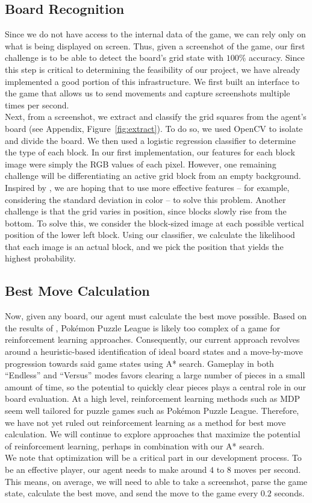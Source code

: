 \documentclass[10pt, final]{article}
\newcommand{\br}[1][.75]{\ \\[#1\baselineskip]}
\begin{document}
\subsection{Board Recognition}
Since we do not have access to the internal data of the game, we can rely only on what is being displayed on screen. Thus, given a screenshot of the game, our first challenge is to be able to detect the board's grid state with $100\%$ accuracy. Since this step is critical to determining the feasibility of our project, we have already implemented a good portion of this infrastructure. We first built an interface to the game that allows us to send movements and capture screenshots multiple times per second.\br
Next, from a screenshot, we extract and classify the grid squares from the agent's board (see Appendix, Figure~\ref{fig:extract}). To do so, we used OpenCV to isolate and divide the board. We then used a logistic regression classifier to determine the type of each block. In our first implementation, our features for each block image were simply the RGB values of each pixel. However, one remaining challenge will be differentiating an active grid block from an empty background. Inspired by \cite{1}, we are hoping that to use more effective features -- for example, considering the standard deviation in color -- to solve this problem. Another challenge is that the grid varies in position, since blocks slowly rise from the bottom. To solve this, we consider the block-sized image at each possible vertical position of the lower left block. Using our classifier, we calculate the likelihood that each image is an actual block, and we pick the position that yields the highest probability.

\subsection{Best Move Calculation}
Now, given any board, our agent must calculate the best move possible. Based on the results of \cite{2}, Pok\'{e}mon Puzzle League is likely too complex of a game for reinforcement learning approaches. Consequently, our current approach revolves around a heuristic-based identification of ideal board states and a move-by-move progression towards said game states using A* search. Gameplay in both ``Endless'' and ``Versus'' modes favors clearing a large number of pieces in a small amount of time, so the potential to quickly clear pieces plays a central role in our board evaluation. At a high level, reinforcement learning methods such as MDP seem well tailored for puzzle games such as Pok\'{e}mon Puzzle League. Therefore, we have not yet ruled out reinforcement learning as a method for best move calculation. We will continue to explore approaches that maximize the potential of reinforcement learning, perhaps in combination with our A* search.\br
We note that optimization will be a critical part in our development process. To be an effective player, our agent needs to make around $4$ to $8$ moves per second. This means, on average, we will need to able to take a screenshot, parse the game state, calculate the best move, and send the move to the game every $0.2$ seconds.
\end{document}
